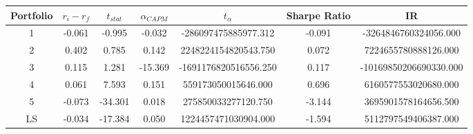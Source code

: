 \begin{tabular}{ccccccc}
\toprule
Portfolio & $r_i - r_f$ & $t_{stat}$ & $\alpha_{CAPM}$ & $t_{\alpha}$ & Sharpe Ratio & IR \\
\midrule
1 & -0.061 & -0.995 & -0.032 & -286097475885977.312 & -0.091 & -3264846760324056.000 \\
2 & 0.402 & 0.785 & 0.142 & 2248224154820543.750 & 0.072 & 7224655780888126.000 \\
3 & 0.115 & 1.281 & -15.369 & -1691176820516556.250 & 0.117 & -10169850206690330.000 \\
4 & 0.061 & 7.593 & 0.151 & 559173050015646.000 & 0.696 & 6160577553020680.000 \\
5 & -0.073 & -34.301 & 0.018 & 275850033277120.750 & -3.144 & 3695901578164656.500 \\
LS & -0.034 & -17.384 & 0.050 & 1224457471030904.000 & -1.594 & 5112797549406387.000 \\
\bottomrule
\end{tabular}
